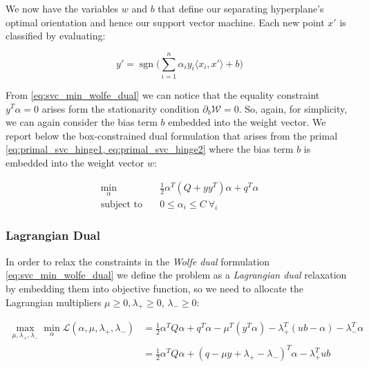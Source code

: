 We now have the variables $w$ and $b$ that define our separating hyperplane's optimal orientation and hence our support vector machine. Each new point $x'$ is classified by evaluating:

\begin{equation} \label{eq:svc_pred}
    y'=\operatorname{sgn}\big(\sum_{i=1}^{n}\alpha_i y_i\langle x_i, x' \rangle+b\big)
\end{equation}

From \ref{eq:svc_min_wolfe_dual} we can notice that the equality constraint $y^T \alpha = 0$ arises form the stationarity condition $\partial_{{b}} \mathcal{W}=0$. So, again, for simplicity, we can again consider the bias term $b$ embedded into the weight vector. We report below the box-constrained dual formulation \cite{hsu2002simple} that arises from the primal \ref{eq:primal_svc_hinge1, eq:primal_svc_hinge2} where the bias term $b$ is embedded into the weight vector $w$:

\begin{equation} \label{eq:svc_min_bcqp_wolf_dual}
    \begin{aligned}
        \min_{\alpha} \quad & \frac{1}{2} \alpha^T (Q + yy^T)\alpha+q^T\alpha \\
            \textrm{subject to} \quad & 0\leq\alpha_i\leq C \ \forall_i
    \end{aligned}
\end{equation}

\subsubsection{Lagrangian Dual}

In order to relax the constraints in the \emph{Wolfe dual} formulation \ref{eq:svc_min_wolfe_dual} we define the problem as a \emph{Lagrangian dual} relaxation by embedding them into objective function, so we need to allocate the Lagrangian multipliers $\mu \geq 0, \lambda_+ \geq 0$, $\lambda_- \geq 0$:

\begin{equation} \label{eq:svc_lagrangian_dual}
	\begin{aligned}
		    \max_{\mu,\lambda_+,\lambda_-} \min_{\alpha} \mathcal{L}(\alpha,\mu,\lambda_+,\lambda_-) &= \frac{1}{2} \alpha^T Q\alpha+q^T\alpha - \mu^T (y^T \alpha) - \lambda_+^T (ub - \alpha) - \lambda_-^T \alpha \\
    &= \frac{1}{2} \alpha^T Q\alpha + (q - \mu y + \lambda_+ - \lambda_-)^T \alpha - \lambda_+^T ub
	\end{aligned}
\end{equation}

